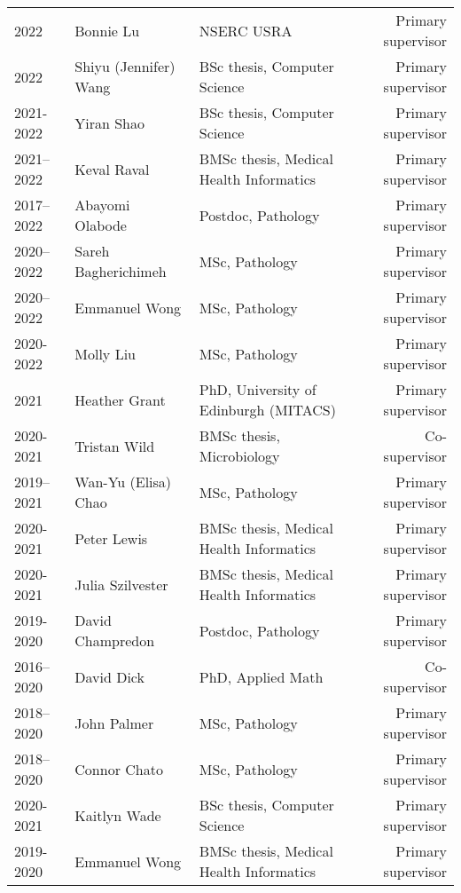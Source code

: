 \begin{tabular}{llp{2.5in}r}
2022 & Bonnie Lu & NSERC USRA & Primary supervisor\\

2022 & Shiyu (Jennifer) Wang & BSc thesis, Computer Science & Primary supervisor\\

2021-2022 & Yiran Shao & BSc thesis, Computer Science & Primary supervisor\\


2021--2022 & Keval Raval & BMSc thesis, Medical Health Informatics & Primary supervisor\\

2017--2022 & Abayomi Olabode & Postdoc, Pathology & Primary supervisor\\

2020--2022 & Sareh Bagherichimeh & MSc, Pathology & Primary supervisor\\

2020--2022 & Emmanuel Wong & MSc, Pathology & Primary supervisor\\
2020-2022 & Molly Liu & MSc, Pathology & Primary supervisor\\

2021 & Heather Grant & PhD, University of Edinburgh (MITACS) & Primary supervisor\\

2020-2021 & Tristan Wild & BMSc thesis, Microbiology & Co-supervisor\\

2019--2021 & Wan-Yu (Elisa) Chao & MSc, Pathology & Primary supervisor\\



2020-2021 & Peter Lewis & BMSc thesis, Medical Health Informatics & Primary supervisor\\
2020-2021 & Julia Szilvester & BMSc thesis, Medical Health Informatics & Primary supervisor\\

2019-2020 & David Champredon & Postdoc, Pathology & Primary supervisor\\

2016--2020 & David Dick & PhD, Applied Math & Co-supervisor\\

2018--2020 & John Palmer & MSc, Pathology & Primary supervisor\\

2018--2020 & Connor Chato & MSc, Pathology & Primary supervisor\\

2020-2021 & Kaitlyn Wade & BSc thesis, Computer Science & Primary supervisor\\
2019-2020 & Emmanuel Wong & BMSc thesis, Medical Health Informatics & Primary supervisor\\

\hline

\end{tabular}



